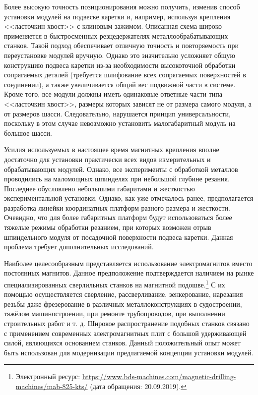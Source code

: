 Более высокую точность позиционирования можно получить, изменив способ установки модулей на подвеске каретки и, например, используя крепления <<ласточкин хвост>> с клиновым зажимом. Описанная схема широко применяется в быстросменных резцедержателях металлообрабатывающих станков. Такой подход обеспечивает отличную точность и повторяемость при переустановке модулей вручную. Однако это значительно усложняет общую конструкцию подвеса каретки из-за необходимости высокоточной обработки сопрягаемых деталей (требуется шлифование всех сопрягаемых поверхностей в соединении), а также увеличивается общий вес подвижной части в системе. Кроме того, все модули должны иметь одинаковые ответные части типа <<ласточкин хвост>>, размеры которых зависят не от размера самого модуля, а от размеров шасси. Следовательно, нарушается принцип универсальности, поскольку в этом случае невозможно установить малогабаритный модуль на большое шасси.

Усилия используемых в настоящее время магнитных крепления вполне достаточно для установки практически всех видов измерительных и обрабатывающих модулей. Однако, все эксперименты с обработкой металлов проводились на маломощных шпинделях при небольшой глубине резания. Последнее обусловлено небольшими габаритами и жесткостью экспериментальной установки. Однако, как уже отмечалось ранее, предполагается разработка линейки координатных платформ разного размера и жесткости. Очевидно, что для более габаритных платформ будут использоваться более тяжелые режимы обработки резанием, при которых возможен отрыв шпиндельного модуля от посадочной поверхности подвеса каретки. Данная проблема требует дополнительных исследований.

Наиболее целесообразным представляется использование электромагнитов вместо постоянных магнитов. Данное предположение подтверждается наличием на рынке специализированных сверлильных станков на магнитной подошве.\footnote{Электронный ресурс: {\tiny\url{https://www.bds-machines.com/magnetic-drilling-machines/mab-825-kts/}} (дата обращения: 20.09.2019).} С их помощью осуществляется сверление, рассверливание, зенкерование, нарезания резьбы даже фрезерование в различных металлоконструкциях в судостроении, тяжёлом машиностроении, при ремонте трубопроводов, при выполнении строительных работ и т. д. Широкое распространение подобных станков связано с применением современных электромагнитных плит с большой удерживающей силой, являющихся основанием станков. Данный положительный опыт может быть использован для модернизации предлагаемой концепции установки модулей.

